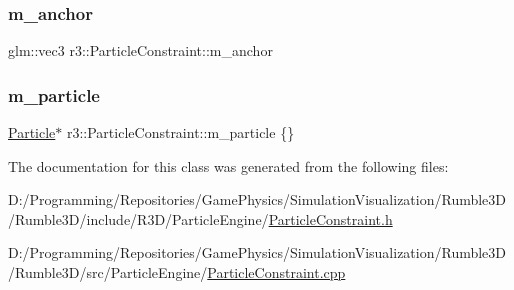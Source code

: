 \subsubsection{\texorpdfstring{m\+\_\+anchor}{m\_anchor}}
{\footnotesize\ttfamily glm\+::vec3 r3\+::\+Particle\+Constraint\+::m\+\_\+anchor\hspace{0.3cm}{\ttfamily [protected]}}

\mbox{\label{classr3_1_1_particle_constraint_ad6a80699b1e0579c4a307f3a7ac49d26}} 
\subsubsection{\texorpdfstring{m\+\_\+particle}{m\_particle}}
{\footnotesize\ttfamily \mbox{\hyperlink{classr3_1_1_particle}{Particle}}$\ast$ r3\+::\+Particle\+Constraint\+::m\+\_\+particle \{\}\hspace{0.3cm}{\ttfamily [protected]}}



The documentation for this class was generated from the following files\+:\begin{DoxyCompactItemize}
\item 
D\+:/\+Programming/\+Repositories/\+Game\+Physics/\+Simulation\+Visualization/\+Rumble3\+D/\+Rumble3\+D/include/\+R3\+D/\+Particle\+Engine/\mbox{\hyperlink{_particle_constraint_8h}{Particle\+Constraint.\+h}}\item 
D\+:/\+Programming/\+Repositories/\+Game\+Physics/\+Simulation\+Visualization/\+Rumble3\+D/\+Rumble3\+D/src/\+Particle\+Engine/\mbox{\hyperlink{_particle_constraint_8cpp}{Particle\+Constraint.\+cpp}}\end{DoxyCompactItemize}
